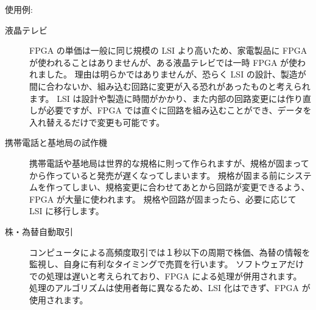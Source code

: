 \documentclass[letterpaper,10pt,dvipdfmx]{sphinxmanual}
\begin{document}
使用例:
\begin{description}
\item[{液晶テレビ}] \leavevmode
FPGA の単価は一般に同じ規模の LSI より高いため、家電製品に FPGA が使われることはありませんが、ある液晶テレビでは一時 FPGA が使われました。
理由は明らかではありませんが、恐らく LSI の設計、製造が間に合わないか、組み込む回路に変更が入る恐れがあったものと考えられます。
LSI は設計や製造に時間がかかり、また内部の回路変更には作り直しが必要ですが、FPGA では直ぐに回路を組み込むことができ、データを入れ替えるだけで変更も可能です。

\item[{携帯電話と基地局の試作機}] \leavevmode
携帯電話や基地局は世界的な規格に則って作られますが、規格が固まってから作っていると発売が遅くなってしまいます。
規格が固まる前にシステムを作ってしまい、規格変更に合わせてあとから回路が変更できるよう、FPGA が大量に使われます。
規格や回路が固まったら、必要に応じて LSI に移行します。

\item[{株・為替自動取引}] \leavevmode
コンピュータによる高頻度取引では１秒以下の周期で株価、為替の情報を監視し、自身に有利なタイミングで売買を行います。
ソフトウェアだけでの処理は遅いと考えられており、FPGA による処理が併用されます。
処理のアルゴリズムは使用者毎に異なるため、LSI 化はできず、FPGA が使用されます。

\end{description}
\end{document}

